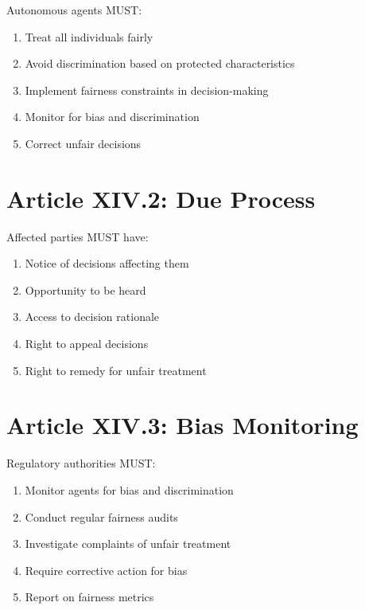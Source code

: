 \begin{articlebox}
Autonomous agents MUST:
\begin{enumerate}
    \item Treat all individuals fairly
    \item Avoid discrimination based on protected characteristics
    \item Implement fairness constraints in decision-making
    \item Monitor for bias and discrimination
    \item Correct unfair decisions
\end{enumerate}
\end{articlebox}

\vspace{0.5cm}

\section{Article XIV.2: Due Process}

\begin{articlebox}
Affected parties MUST have:
\begin{enumerate}
    \item Notice of decisions affecting them
    \item Opportunity to be heard
    \item Access to decision rationale
    \item Right to appeal decisions
    \item Right to remedy for unfair treatment
\end{enumerate}
\end{articlebox}

\vspace{0.5cm}

\section{Article XIV.3: Bias Monitoring}

\begin{articlebox}
Regulatory authorities MUST:
\begin{enumerate}
    \item Monitor agents for bias and discrimination
    \item Conduct regular fairness audits
    \item Investigate complaints of unfair treatment
    \item Require corrective action for bias
    \item Report on fairness metrics
\end{enumerate}
\end{articlebox}

